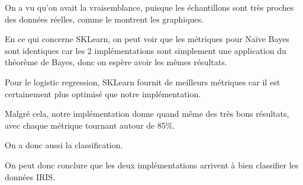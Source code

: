 \documentclass[
]{article}
\begin{document}
On a vu qu'on avait la vraisemblance, puisque les échantillons sont très
proches des données réelles, comme le montrent les graphiques.

En ce qui concerne SKLearn, on peut voir que les métriques pour Naïve
Bayes sont identiques car les 2 implémentations sont simplement une
application du théorème de Bayes, donc on espère avoir les mêmes
résultats.

Pour le logistic regression, SKLearn fournit de meilleurs métriques car
il est certainement plus optimisé que notre implémentation.

Malgré cela, notre implémentation donne quand même des très bons
résultats, avec chaque métrique tournant autour de 85\%.

On a donc aussi la classification.

On peut donc conclure que les deux implémentations arrivent à bien
classifier les données IRIS.

\newpage{}

\printbibliography[heading=bibintoc, title={Références}]
\end{document}
